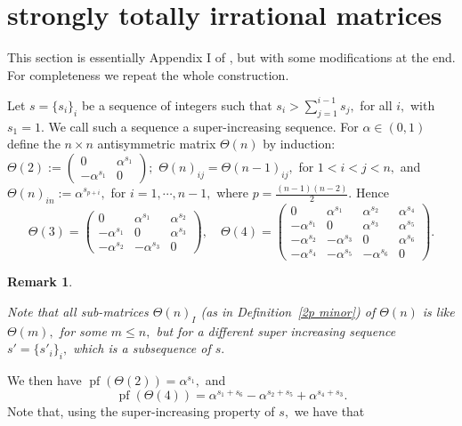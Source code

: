\documentclass[9pt, BCOR=2mm]{amsart}
\numberwithin{equation}{section}
\numberwithin{equation}{section}
\newtheorem{remark}[theorem]{Remark}
\newcommand{\pf}{{\operatorname{pf}}}
\begin{document}
  
   
  
  
  




 
 \section{strongly totally irrational matrices}\label{sec:strongly_irr}
 
 This section is essentially Appendix I of \cite{CH21}, but with some modifications at the end. For completeness we repeat the whole construction.
 
 Let $s=\{s_i\}_i$ be a sequence of integers such that $s_i>\sum\limits_{j=1}^{i-1}s_j,$ for all $i,$ with $s_1=1.$ We call such a sequence a super-increasing sequence. For $\alpha \in (0,1)$ define the $n \times n$ antisymmetric matrix $\Theta(n)$ by induction: $\Theta(2):=\left(\begin{array}{cc}0 & \alpha^{s_1} \\ -\alpha^{s_1} & 0\end{array}\right);$ $\Theta(n)_{ij} = \Theta(n-1)_{ij},$ for $1<i<j<n,$ and $\Theta(n)_{in}:= \alpha^{s_{p+i}},$ for $i=1,\cdots, n-1,$ where $p=\frac{(n-1)(n-2)}{2}.$ 
Hence
$$\Theta(3)=\left(\begin{array}{ccc}0 & \alpha^{s_1} & \alpha^{s_2}\\ -\alpha^{s_1} & 0 & \alpha^{s_3} \\ -\alpha^{s_2} & -\alpha^{s_3} & 0 \end{array}\right), \quad\Theta(4)=\left(\begin{array}{cccc}0 & \alpha^{s_1} & \alpha^{s_2} & \alpha^{s_4}\\ -\alpha^{s_1} & 0 & \alpha^{s_3} & \alpha^{s_5} \\ -\alpha^{s_2} & -\alpha^{s_3} & 0 & \alpha^{s_6} \\ -\alpha^{s_4} & -\alpha^{s_5}  & -\alpha^{s_6}& 0 \end{array}\right).$$


 \begin{remark}\label{rem:submatrices_super}
 	
 Note that all sub-matrices $\Theta(n)_I$ (as in Definition~\ref{2p minor}) of $\Theta(n)$ is like $\Theta(m),$ for some $m \le n,$ but for a different super increasing sequence $s'=\{s'_i\}_i,$ which is a subsequence of $s.$
   \end{remark} \noindent We then have $\pf(\Theta(2))=\alpha^{s_1},$ and
$$\pf(\Theta(4))=\alpha^{s_1+s_6}-\alpha^{s_2+s_5}+\alpha^{s_4+s_3}.$$
Note that, using the super-increasing property of $s,$ we have that
\end{document}
